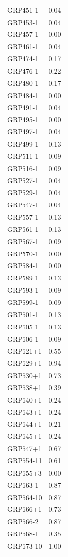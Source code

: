 \begin{longtable}{|l|r|}
GRP451-1 & 0.04 \\
GRP453-1 & 0.04 \\
GRP457-1 & 0.00 \\
GRP461-1 & 0.04 \\
GRP474-1 & 0.17 \\
GRP476-1 & 0.22 \\
GRP480-1 & 0.17 \\
GRP484-1 & 0.00 \\
GRP491-1 & 0.04 \\
GRP495-1 & 0.00 \\
GRP497-1 & 0.04 \\
GRP499-1 & 0.13 \\
GRP511-1 & 0.09 \\
GRP516-1 & 0.09 \\
GRP527-1 & 0.04 \\
GRP529-1 & 0.04 \\
GRP547-1 & 0.04 \\
GRP557-1 & 0.13 \\
GRP561-1 & 0.13 \\
GRP567-1 & 0.09 \\
GRP570-1 & 0.00 \\
GRP584-1 & 0.00 \\
GRP589-1 & 0.13 \\
GRP593-1 & 0.09 \\
GRP599-1 & 0.09 \\
GRP601-1 & 0.13 \\
GRP605-1 & 0.13 \\
GRP606-1 & 0.09 \\
GRP621+1 & 0.55 \\
GRP629+1 & 0.94 \\
GRP630+1 & 0.73 \\
GRP638+1 & 0.39 \\
GRP640+1 & 0.24 \\
GRP643+1 & 0.24 \\
GRP644+1 & 0.21 \\
GRP645+1 & 0.24 \\
GRP647+1 & 0.67 \\
GRP654-11 & 0.61 \\
GRP655+3 & 0.00 \\
GRP663-1 & 0.87 \\
GRP664-10 & 0.87 \\
GRP666+1 & 0.73 \\
GRP666-2 & 0.87 \\
GRP668-1 & 0.35 \\
GRP673-10 & 1.00 \\

\end{longtable}
